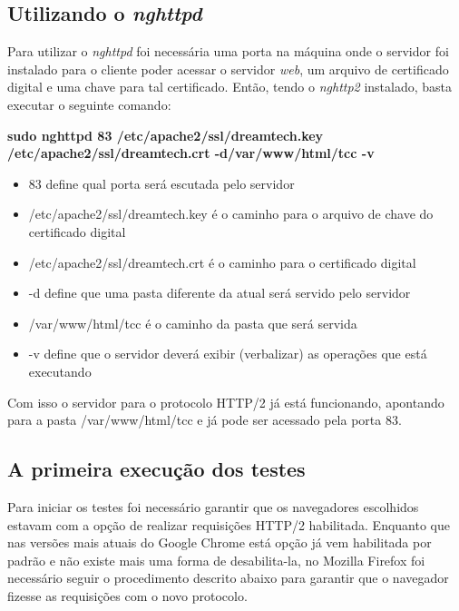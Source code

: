 \subsection{Utilizando o \textit{nghttpd}}
\label{utilizandoonghttpd}

Para utilizar o \textit{nghttpd} foi necessária uma porta na máquina onde o servidor foi instalado para o cliente poder acessar o servidor \textit{web}, um arquivo de certificado digital e uma chave para tal certificado. Então, tendo o \textit{nghttp2} instalado, basta executar o seguinte comando:

\textbf{sudo nghttpd 83 /etc/apache2/ssl/dreamtech.key /etc/apache2/ssl/dreamtech.crt -d/var/www/html/tcc -v}

\begin{itemize}
	\item 83 define qual porta será escutada pelo servidor
	\item /etc/apache2/ssl/dreamtech.key é o caminho para o arquivo de chave do certificado digital
	\item /etc/apache2/ssl/dreamtech.crt é o caminho para o certificado digital
	\item -d define que uma pasta diferente da atual será servido pelo servidor
	\item /var/www/html/tcc é o caminho da pasta que será servida
	\item -v define que o servidor deverá exibir (verbalizar) as operações que está executando
\end{itemize}

Com isso o servidor para o protocolo HTTP/2 já está funcionando, apontando para a pasta /var/www/html/tcc e já pode ser acessado pela porta 83.

\subsection{A primeira execução dos testes}
\label{aprimeiraexecucaodostestes}

Para iniciar os testes foi necessário garantir que os navegadores escolhidos estavam com a opção de realizar requisições HTTP/2 habilitada. Enquanto que nas versões mais atuais do Google Chrome está opção já vem habilitada por padrão e não existe mais uma forma de desabilita-la, no Mozilla Firefox foi necessário seguir o procedimento descrito abaixo para garantir que o navegador fizesse as requisições com o novo protocolo.


